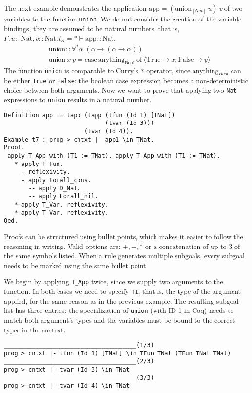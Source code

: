 \documentclass[fleqn]{scrreprt}
\newcommand{\todo}[1]{\marginpar{\textbf{TODO:} #1}}
\newcommand{\coqinline}[1]{\texttt{#1}}
\begin{document}
The next example demonstrates the application $\text{app} = (\text{union}_{[Nat]} \: u) \: v \:$of two variables to the function \texttt{union}. We do not consider the creation of the variable bindings, they are assumed to be natural numbers, that is, $\Gamma, u :: \text{Nat}, v :: \text{Nat}, t_{\alpha} = * \vdash \text{app} :: \text{Nat}$.
\begin{align*}
&\text{union}::\forall^{*}\alpha.(\alpha \rightarrow (\alpha \rightarrow \alpha))\\
&\text{union}\: x \: y = \text{case}\: \text{anything}_{\text{Bool}} \; \text{of}\: \langle \text{True} \rightarrow x; \text{False} \rightarrow y\rangle
\end{align*}
The function \texttt{union} is comparable to Curry's \texttt{?} operator, since anything$_{Bool}$ can be either \texttt{True} or \texttt{False}; the boolean case expression becomes a non-deterministic choice between both arguments. Now we want to prove that applying two \texttt{Nat} expressions to \texttt{union} results in a natural number.
\begin{verbatim}
Definition app := tapp (tapp (tfun (Id 1) [TNat])
                             (tvar (Id 3)))
                       (tvar (Id 4)).    
Example t7 : prog > cntxt |- app1 \in TNat.              
Proof.
 apply T_App with (T1 := TNat). apply T_App with (T1 := TNat).
   * apply T_Fun.
     - reflexivity.
     - apply Forall_cons.
       -- apply D_Nat.
       -- apply Forall_nil.
   * apply T_Var. reflexivity.
   * apply T_Var. reflexivity.
Qed.
\end{verbatim}
Proofs can be structured using bullet points, which makes it easier to follow the reasoning in writing. Valid options are: $+, -, *$ or a concatenation of up to 3 of the same symbols listed. When a rule generates multiple subgoals, every subgoal needs to be marked using the same bullet point. \todo{Am Anfang einführen?}
\par
We begin by applying \coqinline{T_App} twice, since we supply two arguments to the function. In both cases we need to specify \coqinline{T1}, that is, the type of the argument applied, for the same reason as in the previous example. The resulting subgoal list has three entries: the specialization of \texttt{union} (with ID 1 in Coq) needs to match both argument's types and the variables must be bound to the correct types in the context. 
\begin{verbatim}
______________________________________(1/3)
prog > cntxt |- tfun (Id 1) [TNat] \in TFun TNat (TFun TNat TNat)
______________________________________(2/3)
prog > cntxt |- tvar (Id 3) \in TNat
______________________________________(3/3)
prog > cntxt |- tvar (Id 4) \in TNat
\end{verbatim}
\end{document}

